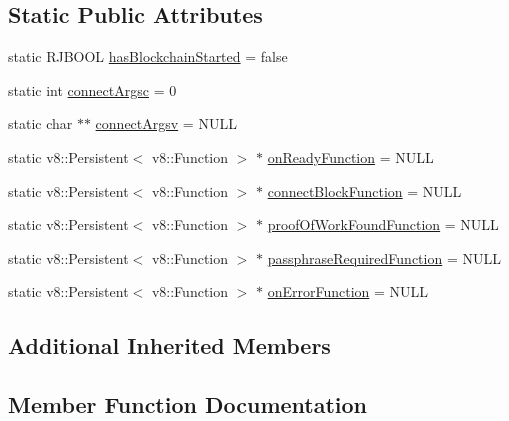 \subsection*{Static Public Attributes}
\begin{DoxyCompactItemize}
\item 
static R\+J\+B\+O\+OL \mbox{\hyperlink{class_rad_j_a_v_1_1_blockchain_v1_a54140bac5bb358c20a04f52958a8299b}{has\+Blockchain\+Started}} = false
\item 
static int \mbox{\hyperlink{class_rad_j_a_v_1_1_blockchain_v1_add7a541f4f74dc9e469bc8a4da6df87c}{connect\+Argsc}} = 0
\item 
static char $\ast$$\ast$ \mbox{\hyperlink{class_rad_j_a_v_1_1_blockchain_v1_a89e9a30cf561941a8b2491a79c45adc9}{connect\+Argsv}} = N\+U\+LL
\item 
static v8\+::\+Persistent$<$ v8\+::\+Function $>$ $\ast$ \mbox{\hyperlink{class_rad_j_a_v_1_1_blockchain_v1_a8cf82762e27e3c60f0a3698f43df2463}{on\+Ready\+Function}} = N\+U\+LL
\item 
static v8\+::\+Persistent$<$ v8\+::\+Function $>$ $\ast$ \mbox{\hyperlink{class_rad_j_a_v_1_1_blockchain_v1_a943ec6a526c6269f99a17ebd5a8940ed}{connect\+Block\+Function}} = N\+U\+LL
\item 
static v8\+::\+Persistent$<$ v8\+::\+Function $>$ $\ast$ \mbox{\hyperlink{class_rad_j_a_v_1_1_blockchain_v1_a796671cbcc1c01cd35420d984eb9caa9}{proof\+Of\+Work\+Found\+Function}} = N\+U\+LL
\item 
static v8\+::\+Persistent$<$ v8\+::\+Function $>$ $\ast$ \mbox{\hyperlink{class_rad_j_a_v_1_1_blockchain_v1_a29510eea101ac67e461bf8884c7d53d2}{passphrase\+Required\+Function}} = N\+U\+LL
\item 
static v8\+::\+Persistent$<$ v8\+::\+Function $>$ $\ast$ \mbox{\hyperlink{class_rad_j_a_v_1_1_blockchain_v1_aef0db34b6a89764b4454f89628325adb}{on\+Error\+Function}} = N\+U\+LL
\end{DoxyCompactItemize}
\subsection*{Additional Inherited Members}


\subsection{Member Function Documentation}
\mbox{\label{class_rad_j_a_v_1_1_blockchain_v1_aeebfff8fbed8ce3edfbd6dda19acb9a9}} 
